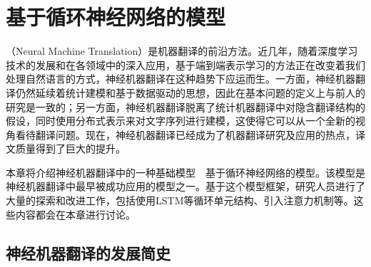 
%


\renewcommand\figurename{图}%
\renewcommand\tablename{表}%


\chapter{基于循环神经网络的模型}

 （Neural Machine Translation）是机器翻译的前沿方法。近几年，随着深度学习技术的发展和在各领域中的深入应用，基于端到端表示学习的方法正在改变着我们处理自然语言的方式，神经机器翻译在这种趋势下应运而生。一方面，神经机器翻译仍然延续着统计建模和基于数据驱动的思想，因此在基本问题的定义上与前人的研究是一致的；另一方面，神经机器翻译脱离了统计机器翻译中对隐含翻译结构的假设，同时使用分布式表示来对文字序列进行建模，这使得它可以从一个全新的视角看待翻译问题。现在，神经机器翻译已经成为了机器翻译研究及应用的热点，译文质量得到了巨大的提升。

\parinterval 本章将介绍神经机器翻译中的一种基础模型\ \dash \ 基于循环神经网络的模型。该模型是神经机器翻译中最早被成功应用的模型之一。基于这个模型框架，研究人员进行了大量的探索和改进工作，包括使用LSTM等循环单元结构、引入注意力机制等。这些内容都会在本章进行讨论。

\section{神经机器翻译的发展简史}


